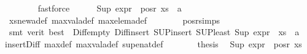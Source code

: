 \begin{isabellebody}
\ \ \ \ \ \ \isamarkupfalse%
\ fastforce\isanewline
\ \ \ \ \isamarkupfalse%
\ {\isachardoublequoteopen}Sup\ {\isacharparenleft}{\kern0pt}expr{\isacharunderscore}{\kern0pt}{}\ {\isacharbackquote}{\kern0pt}\ {\isacharparenleft}{\kern0pt}pos{\isacharunderscore}{\kern0pt}r\ {\isacharparenleft}{\kern0pt}xs\ {\isasymunion}\ {\isacharbraceleft}{\kern0pt}a{\isacharbraceright}{\kern0pt}{\isacharparenright}{\kern0pt}{\isacharparenright}{\kern0pt}{\isacharparenright}{\kern0pt}\ {\isasymge}\ {\isasyminfinity}{\isachardoublequoteclose}\isanewline
\ \ \ \ \ \ \isamarkupfalse%
\ xs{\isacharunderscore}{\kern0pt}new{\isacharunderscore}{\kern0pt}a{\isacharunderscore}{\kern0pt}def\ max{\isacharunderscore}{\kern0pt}val{\isacharunderscore}{\kern0pt}a{\isacharunderscore}{\kern0pt}def\ max{\isacharunderscore}{\kern0pt}elem{\isacharunderscore}{\kern0pt}a{\isacharunderscore}{\kern0pt}def\isanewline
\ \ \ \ \ \ \isamarkupfalse%
\ pos{\isacharunderscore}{\kern0pt}r{\isachardot}{\kern0pt}simps\isanewline
\ \ \ \ \ \ \isamarkupfalse%
\ {\isacharparenleft}{\kern0pt}smt\ {\isacharparenleft}{\kern0pt}verit{\isacharcomma}{\kern0pt}\ best{\isacharparenright}{\kern0pt}\ {\isachardoublequoteopen}{}{\isachardoublequoteclose}\ Diff{\isacharunderscore}{\kern0pt}empty\ Diff{\isacharunderscore}{\kern0pt}insert{}\ SUP{\isacharunderscore}{\kern0pt}insert\ SUP{\isacharunderscore}{\kern0pt}least\ {\isacartoucheopen}Sup\ {\isacharparenleft}{\kern0pt}expr{\isacharunderscore}{\kern0pt}{}\ {\isacharbackquote}{\kern0pt}\ {\isacharparenleft}{\kern0pt}xs\ {\isasymunion}\ {\isacharbraceleft}{\kern0pt}a{\isacharbraceright}{\kern0pt}{\isacharparenright}{\kern0pt}{\isacharparenright}{\kern0pt}\ {\isacharequal}{\kern0pt}\ {\isasyminfinity}{\isacartoucheclose}\ insert{\isacharunderscore}{\kern0pt}Diff\ max{\isacharunderscore}{\kern0pt}def\ max{\isacharunderscore}{\kern0pt}val{\isacharunderscore}{\kern0pt}a{\isacharunderscore}{\kern0pt}def\ sup{\isacharunderscore}{\kern0pt}enat{\isacharunderscore}{\kern0pt}def{\isacharparenright}{\kern0pt}\isanewline
\ \ \ \ \isamarkupfalse%
\ \isamarkupfalse%
\ {\isacharquery}{\kern0pt}thesis\ \isamarkupfalse%
\ {\isacartoucheopen}Sup\ {\isacharparenleft}{\kern0pt}expr{\isacharunderscore}{\kern0pt}{}\ {\isacharbackquote}{\kern0pt}\ {\isacharparenleft}{\kern0pt}pos{\isacharunderscore}{\kern0pt}r\ xs{\isacharparenright}{\kern0pt}{\isacharparenright}{\kern0pt}\ {\isasymge}\ {\isasyminfinity}{\isacartoucheclose}\isanewline

\end{isabellebody}
